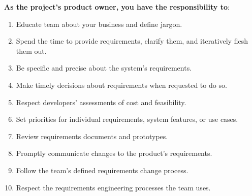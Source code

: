 

{\bfseries As the project's product owner, you have the responsibility to}:
\begin{enumerate}[itemsep = 0.25em]
    \item Educate team about your business and define jargon.
    \item Spend the time to provide requirements, clarify them, and iteratively
          flesh them out.
    \item Be specific and precise about the system's requirements.
    \item Make timely decisions about requirements when requested to do so.
    \item Respect developers' assessments of cost and feasibility.
    \item Set priorities for individual requirements, system features, or use
          cases.
    \item Review requirements documents and prototypes.
    \item Promptly communicate changes to the product's requirements.
    \item Follow the team's defined requirements change process.
    \item Respect the requirements engineering processes the team uses.
\end{enumerate}